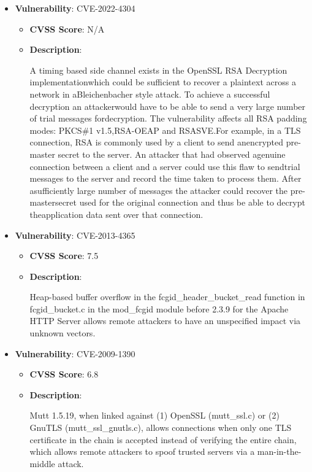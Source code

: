 \documentclass{article}
\begin{document}
\begin{itemize}
        \item \textbf{Vulnerability}: CVE-2022-4304
        \begin{itemize}
            \item \textbf{CVSS Score}:  N/A 
            \item \textbf{Description}:
            \parbox[t]{0.9\linewidth}{
                \ttfamily A timing based side channel exists in the OpenSSL RSA Decryption implementationwhich could be sufficient to recover a plaintext across a network in aBleichenbacher style attack. To achieve a successful decryption an attackerwould have to be able to send a very large number of trial messages fordecryption. The vulnerability affects all RSA padding modes: PKCS\#1 v1.5,RSA-OEAP and RSASVE.For example, in a TLS connection, RSA is commonly used by a client to send anencrypted pre-master secret to the server. An attacker that had observed agenuine connection between a client and a server could use this flaw to sendtrial messages to the server and record the time taken to process them. After asufficiently large number of messages the attacker could recover the pre-mastersecret used for the original connection and thus be able to decrypt theapplication data sent over that connection.
            }
        \end{itemize}
    
        \item \textbf{Vulnerability}: CVE-2013-4365
        \begin{itemize}
            \item \textbf{CVSS Score}:  7.5 
            \item \textbf{Description}:
            \parbox[t]{0.9\linewidth}{
                \ttfamily Heap-based buffer overflow in the fcgid\_header\_bucket\_read function in fcgid\_bucket.c in the mod\_fcgid module before 2.3.9 for the Apache HTTP Server allows remote attackers to have an unspecified impact via unknown vectors.
            }
        \end{itemize}
    
        \item \textbf{Vulnerability}: CVE-2009-1390
        \begin{itemize}
            \item \textbf{CVSS Score}:  6.8 
            \item \textbf{Description}:
            \parbox[t]{0.9\linewidth}{
                \ttfamily Mutt 1.5.19, when linked against (1) OpenSSL (mutt\_ssl.c) or (2) GnuTLS (mutt\_ssl\_gnutls.c), allows connections when only one TLS certificate in the chain is accepted instead of verifying the entire chain, which allows remote attackers to spoof trusted servers via a man-in-the-middle attack.
            }
        \end{itemize}
    

\end{itemize}
\end{document}
